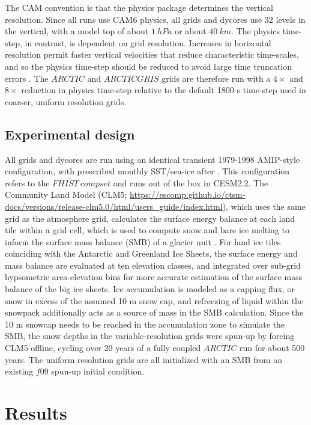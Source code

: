 \documentclass[draft]{agujournal2019}
\begin{document}
The CAM convention is that the physics package determines the vertical resolution. Since all runs use CAM6 physics, all grids and dycores use 32 levels in the vertical, with a model top of about $1 \ hPa$ or about $40 \ km$. The physics time-step, in contrast, is dependent on grid resolution. Increases in horizontal resolution permit faster vertical velocities that reduce characteristic time-scales, and so the physics time-step should be reduced to avoid large time truncation errors \cite{HR2018JAMES}. The $ARCTIC$ and $ARCTICGRIS$ grids are therefore run with a $4\times$ and $8\times$ reduction in physics time-step relative to the default 1800 s time-step used in coarser, uniform resolution grids.

\subsection{Experimental design}

All grids and dycores are run using an identical transient 1979-1998 AMIP-style configuration, with prescribed monthly SST/sea-ice after \cite{CESMSST}. This configuration refers to the $FHIST \ compset$ and runs out of the box in CESM2.2. The Community Land Model (CLM5; \url{https://escomp.github.io/ctsm-docs/versions/release-clm5.0/html/users_guide/index.html}), which uses the same grid as the atmosphere grid, calculates the surface energy balance at each land tile within a grid cell, which is used to compute snow and bare ice melting to inform the surface mass balance (SMB) of a glacier unit \cite{VKETAL2020JGR}. For land ice tiles coinciding with the Antarctic and Greenland Ice Sheets, the surface energy and mass balance are evaluated at ten elevation classes, and integrated over sub-grid hypsometric area-elevation bins for more accurate estimation of the surface mass balance of the big ice sheets. Ice accumulation is modeled as a capping flux, or snow in excess of the assumed 10 m snow cap, and refreezing of liquid within the snowpack additionally acts as a source of mass in the SMB calculation. Since the 10 m snowcap needs to be reached in the accumulation zone to simulate the SMB, the snow depths in the variable-resolution grids were spun-up  by forcing CLM5 offline, cycling over 20 years of a fully coupled $ARCTIC$ run for about 500 years. The uniform resolution grids are all initialized with an SMB from an existing $f09$ spun-up initial condition. 

\section{Results}\label{sec:results}
\end{document}
